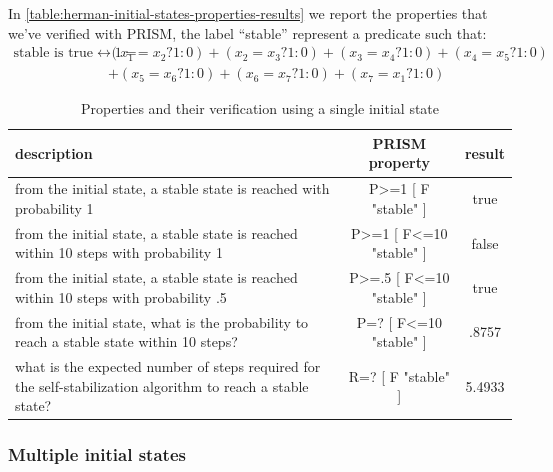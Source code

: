 In \autoref{table:herman-initial-states-properties-results} we report
the properties that we've verified with PRISM, the label ``stable''
represent a predicate such that:
\begin{displaymath}
  \begin{split}
    \text{stable is true} \leftrightarrow 1 = &(x_1=x_2?1:0)+(x_2=x_3?1:0)+(x_3=x_4?1:0)+(x_4=x_5?1:0)\\
    &+(x_5=x_6?1:0)+(x_6=x_7?1:0)+(x_7=x_1?1:0)
  \end{split}
\end{displaymath}


\begin{table}[ht]
  \begin{center}
    \begin{tabular}{p{5cm}cc}
      \hline
      description & PRISM property  & result \\
      \hline     
      from the initial state, a stable state is reached with
      probability 1 & P>=1 [ F "stable" ] & true \\
      from the initial state, a stable state is reached within 10
      steps with probability 1 & P>=1 [ F<=10 "stable" ] & false\\
      from the initial state, a stable state is reached within 10
      steps with probability .5 & P>=.5 [ F<=10 "stable" ] & true\\
      from the initial state, what is the probability to reach a
      stable state within 10 steps? & P=? [ F<=10 "stable" ] & .8757\\
      what is the expected number of steps required for the
      self-stabilization algorithm to reach a stable state? & R=? [ F
      "stable" ] & 5.4933\\
      \hline
    \end{tabular}
    \caption{Properties and their verification using a single initial
      state}
    \label{table:herman-initial-states-properties-results}
  \end{center}
\end{table}

\subsubsection{Multiple initial states}

